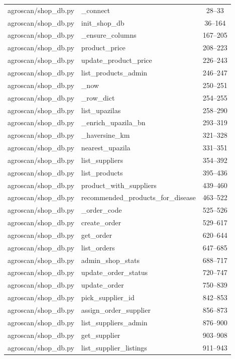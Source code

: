 \begin{center}
\begin{longtable}{@{}p{4.6cm}p{5.2cm}c@{}}
agroscan/shop\_db.py & \_connect & 28--33 \\
agroscan/shop\_db.py & init\_shop\_db & 36--164 \\
agroscan/shop\_db.py & \_ensure\_columns & 167--205 \\
agroscan/shop\_db.py & product\_price & 208--223 \\
agroscan/shop\_db.py & update\_product\_price & 226--243 \\
agroscan/shop\_db.py & list\_products\_admin & 246--247 \\
agroscan/shop\_db.py & \_now & 250--251 \\
agroscan/shop\_db.py & \_row\_dict & 254--255 \\
agroscan/shop\_db.py & list\_upazilas & 258--290 \\
agroscan/shop\_db.py & \_enrich\_upazila\_bn & 293--319 \\
agroscan/shop\_db.py & \_haversine\_km & 321--328 \\
agroscan/shop\_db.py & nearest\_upazila & 331--351 \\
agroscan/shop\_db.py & list\_suppliers & 354--392 \\
agroscan/shop\_db.py & list\_products & 395--436 \\
agroscan/shop\_db.py & product\_with\_suppliers & 439--460 \\
agroscan/shop\_db.py & recommended\_products\_for\_disease & 463--522 \\
agroscan/shop\_db.py & \_order\_code & 525--526 \\
agroscan/shop\_db.py & create\_order & 529--617 \\
agroscan/shop\_db.py & get\_order & 620--644 \\
agroscan/shop\_db.py & list\_orders & 647--685 \\
agroscan/shop\_db.py & admin\_shop\_stats & 688--717 \\
agroscan/shop\_db.py & update\_order\_status & 720--747 \\
agroscan/shop\_db.py & update\_order & 750--839 \\
agroscan/shop\_db.py & pick\_supplier\_id & 842--853 \\
agroscan/shop\_db.py & assign\_order\_supplier & 856--873 \\
agroscan/shop\_db.py & list\_suppliers\_admin & 876--900 \\
agroscan/shop\_db.py & get\_supplier & 903--908 \\
agroscan/shop\_db.py & list\_supplier\_listings & 911--943 \\

\end{longtable}
\end{center}
